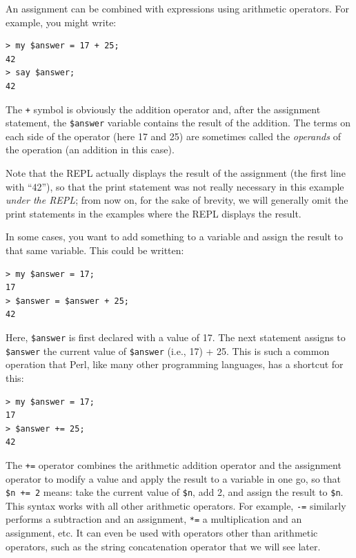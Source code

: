 An assignment can be combined with expressions using arithmetic 
operators. For example, you might write:

\begin{verbatim}
> my $answer = 17 + 25;
42
> say $answer;
42
\end{verbatim}
%

The \verb'+' symbol is obviously the addition operator 
and, after the assignment statement, the \verb'$answer' 
variable contains the result 
of the addition. The terms on each side of the operator 
(here 17 and 25) are sometimes called the \emph{operands} 
of the operation (an addition in this case).

Note that the REPL actually displays the result of the 
assignment (the first line with ``42''), so that the 
print statement was not really necessary in this 
example \emph{under the REPL}; from now on, for the sake of 
brevity, we will generally omit the print statements in the 
examples where the REPL displays the result.

In some cases, you want to add something to a variable 
and assign the result to that same variable. This could 
be written:

\begin{verbatim}
> my $answer = 17;
17
> $answer = $answer + 25;
42
\end{verbatim}
%

Here, \verb"$answer" is first declared with a value of 17. The next 
statement assigns to \verb"$answer" the current value of 
\verb"$answer" (i.e., 17) + 25. This is such a common operation 
that Perl, like many other programming languages, has a 
shortcut for this:

\begin{verbatim}
> my $answer = 17;
17
> $answer += 25;
42
\end{verbatim}
%

The \verb"+=" operator combines the arithmetic addition operator 
and the assignment operator to modify a value and apply the result 
to a variable in one go, so that \verb"$n += 2" means: take 
the current value of \verb"$n", add 2, and assign the result to 
\verb"$n". This syntax works with all other arithmetic operators. 
For example, \verb"-=" similarly performs a subtraction and an 
assignment, \verb"*=" a multiplication and an assignment, etc. It 
can even be used with operators other than arithmetic operators, 
such as the string concatenation operator that we will see later.

